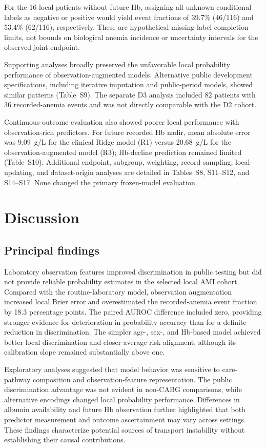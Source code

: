\documentclass[pdflatex,sn-mathphys-num]{sn-jnl}%
\theoremstyle{thmstyleone}%
\theoremstyle{thmstyletwo}%
\theoremstyle{thmstylethree}%
\begin{document}
For the 16 local patients without future Hb, assigning all unknown conditional labels as negative or positive would yield event fractions of 39.7\% (46/116) and 53.4\% (62/116), respectively. These are hypothetical missing-label completion limits, not bounds on biological anemia incidence or uncertainty intervals for the observed joint endpoint.

Supporting analyses broadly preserved the unfavorable local probability performance of observation-augmented models. Alternative public development specifications, including iterative imputation and public-period models, showed similar patterns (Table~S9). The separate D3 analysis included 82 patients with 36 recorded-anemia events and was not directly comparable with the D2 cohort.

Continuous-outcome evaluation also showed poorer local performance with observation-rich predictors. For future recorded Hb nadir, mean absolute error was 9.09~g/L for the clinical Ridge model (R1) versus 20.68~g/L for the observation-augmented model (R3); Hb-decline prediction remained limited (Table~S10). Additional endpoint, subgroup, weighting, record-sampling, local-updating, and dataset-origin analyses are detailed in Tables~S8, S11--S12, and S14--S17. None changed the primary frozen-model evaluation.

\section{Discussion}

\subsection{Principal findings}

Laboratory observation features improved discrimination in public testing but did not provide reliable probability estimates in the selected local AMI cohort. Compared with the routine-laboratory model, observation augmentation increased local Brier error and overestimated the recorded-anemia event fraction by 18.3 percentage points. The paired AUROC difference included zero, providing stronger evidence for deterioration in probability accuracy than for a definite reduction in discrimination. The simpler age-, sex-, and Hb-based model achieved better local discrimination and closer average risk alignment, although its calibration slope remained substantially above one.

Exploratory analyses suggested that model behavior was sensitive to care-pathway composition and observation-feature representation. The public discrimination advantage was not evident in non-CABG comparisons, while alternative encodings changed local probability performance. Differences in albumin availability and future Hb observation further highlighted that both predictor measurement and outcome ascertainment may vary across settings. These findings characterize potential sources of transport instability without establishing their causal contributions.
\end{document}
